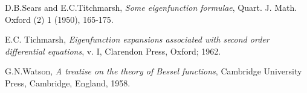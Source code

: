 \begin{thebibliography}{999}
 D.B.Sears and E.C.Titchmarsh, {\em Some eigenfunction formulae}, 
Quart. J. Math. Oxford (2) 1 (1950), 165-175.

 E.C. Tichmarsh, {\em Eigenfunction expansions associated with second 
order differential equations}, v. I, Clarendon Press, Oxford; 1962.

 G.N.Watson, {\em A treatise on the theory of Bessel functions},
Cambridge University Press, Cambridge, England, 1958.


\end{thebibliography}



